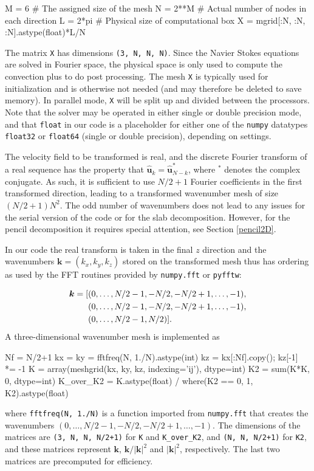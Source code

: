 \documentclass[11pt, oneside]{article}
\newcommand{\inpyth}{\lstinline[keywordstyle={}, basicstyle=\ttfamily]} %[]%
\begin{document}
\begin{python}
M = 6       # The assigned size of the mesh
N = 2**M    # Actual number of nodes in each direction
L = 2*pi    # Physical size of computational box
X = mgrid[:N, :N, :N].astype(float)*L/N
\end{python}
The matrix \inpyth{X} has dimensions \inpyth{(3, N, N, N)}. Since the Navier Stokes equations are solved in Fourier space, the physical space is only used to compute the convection plus to do post processing. The mesh \inpyth{X} is typically used for initialization and is otherwise not needed (and may therefore be deleted to save memory). In parallel mode, \inpyth{X} will be split up and divided between the processors.  Note that the solver may be operated in either single or double precision mode, and that \inpyth{float} in our code is a placeholder for either one of the \texttt{numpy} datatypes \inpyth{float32} or \inpyth{float64} (single or double precision), depending on settings.

The velocity field to be transformed is real, and the discrete Fourier transform of a real sequence has the property that $\hat{\bm{u}}_k = \hat{\bm{u}}_{N-k}^*$, where $^*$ denotes the complex conjugate. As such, it is sufficient to use $N/2+1$ Fourier coefficients in the first transformed direction, leading to a transformed wavenumber mesh of size $(N/2+1)N^2$. The odd number of wavenumbers does not lead to any issues for the serial version of the code or for the slab decomposition. However, for the pencil decomposition it requires special attention, see Section \ref{pencil2D}.

In our code the real transform is taken in the final $z$ direction and the wavenumbers $\bm{k}=(k_x, k_y, k_z)$ stored on the transformed mesh thus has ordering as used by the FFT routines provided by \texttt{numpy.fft} or \texttt{pyfftw}:

\begin{align}
  \bm{k} = [&(0, \ldots, N/2-1, -N/2, -N/2+1, \ldots, -1), \notag \\
   &(0, \ldots, N/2-1, -N/2, -N/2+1, \ldots, -1),  \notag \\
  &(0, \ldots, N/2-1, N/2)].
\end{align}
A three-dimensional wavenumber mesh is implemented as

\begin{python}
Nf = N/2+1
kx = ky = fftfreq(N, 1./N).astype(int)
kz = kx[:Nf].copy(); kz[-1] *= -1
K = array(meshgrid(kx, ky, kz, indexing='ij'), dtype=int)
K2 = sum(K*K, 0, dtype=int)
K_over_K2 = K.astype(float) / where(K2 == 0, 1, K2).astype(float)
\end{python}
where \inpyth{fftfreq(N, 1./N)} is a function imported from \inpyth{numpy.fft} that creates the wavenumbers $(0, \ldots, N/2-1, -N/2, -N/2+1, \ldots, -1)$. The dimensions of the matrices are \inpyth{(3, N, N, N/2+1)} for \texttt{K} and \texttt{K\_over\_K2}, and \inpyth{(N, N, N/2+1)} for \texttt{K2}, and these matrices represent $\bm{k}$, $\bm{k}/|\bm{k}|^2$ and $|\bm{k}|^2$, respectively. The last two matrices are precomputed for efficiency.
\end{document}
